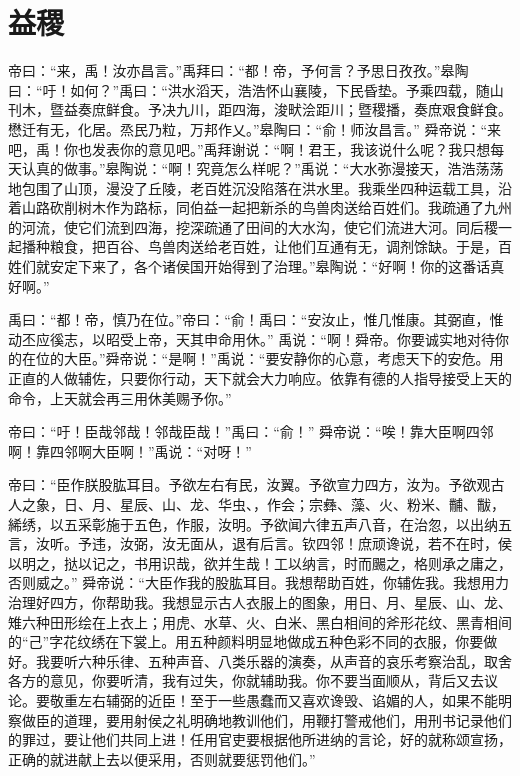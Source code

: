 \documentclass[a4paper,12pt,UTF8,twoside]{ctexbook}
\begin{document}
\chapter{益稷}

帝曰：“来，禹！汝亦昌言。”禹拜曰：“都！帝，予何言？予思日孜孜。”皋陶曰：“吁！如何？”禹曰：“洪水滔天，浩浩怀山襄陵，下民昏垫。予乘四载，随山刊木，暨益奏庶鲜食。予决九川，距四海，浚畎浍距川；暨稷播，奏庶艰食鲜食。懋迁有无，化居。烝民乃粒，万邦作乂。”皋陶曰：“俞！师汝昌言。”
舜帝说：“来吧，禹！你也发表你的意见吧。”禹拜谢说：“啊！君王，我该说什么呢？我只想每天认真的做事。”皋陶说：“啊！究竟怎么样呢？”禹说：“大水弥漫接天，浩浩荡荡地包围了山顶，漫没了丘陵，老百姓沉没陷落在洪水里。我乘坐四种运载工具，沿着山路砍削树木作为路标，同伯益一起把新杀的鸟兽肉送给百姓们。我疏通了九州的河流，使它们流到四海，挖深疏通了田间的大水沟，使它们流进大河。同后稷一起播种粮食，把百谷、鸟兽肉送给老百姓，让他们互通有无，调剂馀缺。于是，百姓们就安定下来了，各个诸侯国开始得到了治理。”皋陶说：“好啊！你的这番话真好啊。”

禹曰：“都！帝，慎乃在位。”帝曰：“俞！禹曰：“安汝止，惟几惟康。其弼直，惟动丕应徯志，以昭受上帝，天其申命用休。”
禹说：“啊！舜帝。你要诚实地对待你的在位的大臣。”舜帝说：“是啊！”禹说：“要安静你的心意，考虑天下的安危。用正直的人做辅佐，只要你行动，天下就会大力响应。依靠有德的人指导接受上天的命令，上天就会再三用休美赐予你。”

帝曰：“吁！臣哉邻哉！邻哉臣哉！”禹曰：“俞！”
舜帝说：“唉！靠大臣啊四邻啊！靠四邻啊大臣啊！”禹说：“对呀！”

帝曰：“臣作朕股肱耳目。予欲左右有民，汝翼。予欲宣力四方，汝为。予欲观古人之象，日、月、星辰、山、龙、华虫、，作会；宗彝、藻、火、粉米、黼、黻，絺绣，以五采彰施于五色，作服，汝明。予欲闻六律五声八音，在治忽，以出纳五言，汝听。予违，汝弼，汝无面从，退有后言。钦四邻！庶顽谗说，若不在时，侯以明之，挞以记之，书用识哉，欲并生哉！工以纳言，时而颺之，格则承之庸之，否则威之。”
舜帝说：“大臣作我的股肱耳目。我想帮助百姓，你辅佐我。我想用力治理好四方，你帮助我。我想显示古人衣服上的图象，用日、月、星辰、山、龙、雉六种田形绘在上衣上；用虎、水草、火、白米、黑白相间的斧形花纹、黑青相间的“己”字花纹绣在下裳上。用五种颜料明显地做成五种色彩不同的衣服，你要做好。我要听六种乐律、五种声音、八类乐器的演奏，从声音的哀乐考察治乱，取舍各方的意见，你要听清，我有过失，你就辅助我。你不要当面顺从，背后又去议论。要敬重左右辅弼的近臣！至于一些愚蠢而又喜欢谗毁、谄媚的人，如果不能明察做臣的道理，要用射侯之礼明确地教训他们，用鞭打警戒他们，用刑书记录他们的罪过，要让他们共同上进！任用官吏要根据他所进纳的言论，好的就称颂宣扬，正确的就进献上去以便采用，否则就要惩罚他们。”
\end{document}
